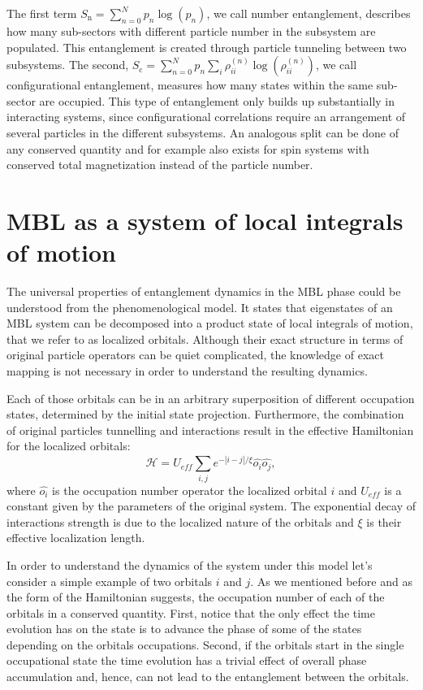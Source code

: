 The first term $S_\text{n} = \sum_{n=0}^N p_n  \log{\left ( p_n \right )}$, we call number entanglement, describes how many sub-sectors with different particle number in the subsystem are populated. This entanglement is created through particle tunneling between two subsystems. The second, $S_\text{c} = \sum_{n=0}^N p_n \sum_{i} \rho_{ii}^{(n)} \log {\left ( \rho_{ii}^{(n)} \right )}$, we call configurational entanglement, measures how many states within the same sub-sector are occupied. This type of entanglement only builds up substantially in interacting systems, since configurational correlations require an arrangement of several particles in the different subsystems. An analogous split can be done of any conserved quantity and for example also exists for spin systems with conserved total magnetization instead of the particle number. 

\section{MBL as a system of local integrals of motion}

The universal properties of entanglement dynamics in the MBL phase could be understood from the phenomenological model\cite{Serbyn2013, Serbyn2013b, Huse2014}. It states that eigenstates of an MBL system can be decomposed into a product state of local integrals of motion, that we refer to as localized orbitals. Although their exact structure in terms of original particle operators can be quiet complicated\cite{Serbyn2013b}, the knowledge of exact mapping is not necessary in order to understand the resulting dynamics. 

Each of those orbitals can be in an arbitrary superposition of different occupation states, determined by the initial state projection. Furthermore, the combination of original particles tunnelling and interactions result in the  effective Hamiltonian for the localized orbitals:
\begin{equation}
\hat{\mathcal{H}} = U_{eff}\sum_{i,j} e^{-\left| i-j\right|/\xi}\hat{o_i}\hat{o_j},
\end{equation}
where $\hat{o_i}$ is the occupation number operator the localized orbital $i$ and $U_{eff}$ is a constant given by the parameters of the original system. The exponential decay of interactions strength is due to the localized nature of the orbitals and $\xi$ is their effective localization length.

In order to understand the dynamics of the system under this model let's consider a simple example of two orbitals $i$ and $j$. As we mentioned before and as the form of the Hamiltonian suggests, the occupation number of each of the orbitals in a conserved quantity. First, notice that the only effect the time evolution has on the state is to advance the phase of some of the states depending on the orbitals occupations. Second, if the orbitals start in the single occupational state the time evolution has a trivial effect of overall phase accumulation and, hence, can not lead to the entanglement between the orbitals.

